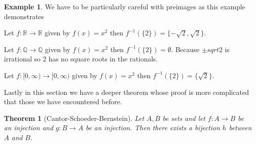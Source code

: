 \documentclass[
]{book}
\newtheorem{theorem}{Theorem}[chapter]
\theoremstyle{definition}
\theoremstyle{definition}
\newtheorem{example}{Example}[chapter]
\theoremstyle{definition}
\theoremstyle{definition}
\theoremstyle{remark}
\begin{document}
\begin{example}
We have to be particularly careful with preimages as this example demonstrates

Let \(f: \mathbb{R} \rightarrow \mathbb{R}\) given by \(f(x) = x^2\) then \(f^{-1}(\{2\}) = \{-\sqrt{2}, \sqrt{2}\}\).

Let \(f: \mathbb{Q} \rightarrow \mathbb{Q}\) given by \(f(x) = x^2\) then \(f^{-1}(\{2\})= \emptyset\). Because \(\pm sqrt{2}\) is irrational so \(2\) has no square roots in the rationals.

Let \(f: [0, \infty) \rightarrow [0, \infty)\) given by \(f(x)=x^2\) then \(f^{-1}(\{2\}) = \{\sqrt{2}\}\).
\end{example}

Lastly in this section we have a deeper theorem whose proof is more complicated that those we have encountered before.

\begin{theorem}[Cantor-Schoeder-Bernstein]
Let \(A, B\) be sets and let \(f: A \rightarrow B\) be an injection and \(g: B \rightarrow A\) be an injection. Then there exists a bijection \(h\) between \(A\) and \(B\).
\end{theorem}
\end{document}
